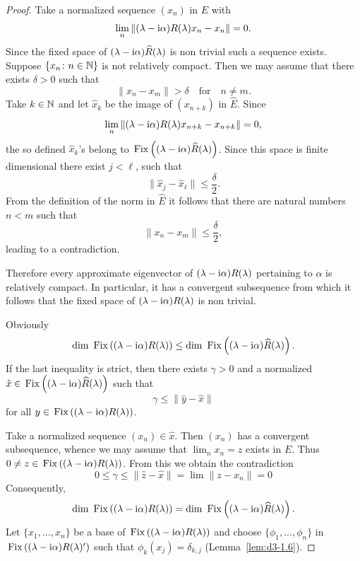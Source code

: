 \begin{proof}
Take a normalized sequence $(x_{n})$ in $E$ with
\[
\lim_{n}\|(\lambda - \mathrm{i}\alpha)R(\lambda)x_{n} - x_{n}\| = 0 .
\]
Since the fixed space of {$(\lambda-\mathrm{i}\alpha)\widehat{R}(\lambda)$} is non trivial such a sequence exists.
Suppose $\{ x_{n} \colon n\in\mathbb{N} \}$ is not relatively compact.
Then we may assume that there exists $\delta > 0$ such that
\[
	\|x_{n} - x_{m}\| > \delta \quad \text{for} \quad n \neq m .
\]
Take $k \in \mathbb{N} $ and let $\hat{x}_{k}$ be the image of\/ $(x_{n+k})$ in $\widehat{E}$.
Since
\[
	\lim_{n}\|(\lambda - \mathrm{i}\alpha)R(\lambda)x_{n+k} - x_{n+k}\| = 0 ,
\]
the so defined $\hat{x}_{k}$'s belong to $\mathop{}\mathrm{Fix}\left((\lambda - \mathrm{i}\alpha)\widehat{R}(\lambda)\right)$.
Since this space is finite dimensional there exist $j < \ell$,  such that
\[
	\|\hat{x}_{j} - \hat{x}_{\ell}\| \leq \frac{\delta}{2} .
\]
From the definition of the norm in $\widehat{E}$ it follows that there are natural numbers $n < m$ such that
\[
\|x_{n} - x_{m}\| \leq \frac{\delta}{2} ,
\]
leading to a contradiction.

Therefore every approximate eigenvector of\/ $(\lambda - \mathrm{i}\alpha)R(\lambda)$ pertaining to $\alpha$ is relatively compact.
In particular, it has a convergent subsequence from which it follows that the fixed space of\/ $(\lambda - \mathrm{i}\alpha)R(\lambda)$ is non trivial.

Obviously
\[
\dim \Fix{(\lambda - \im\alpha)R(\lambda)} \leq \dim \Fix{(\lambda - \im\alpha)\widehat{R}(\lambda)} .
\]
If the last inequality is strict, then there exists $\gamma > 0$ and a normalized 
$\hat{x} \in \mathop{}\mathrm{Fix}\left((\lambda - \mathrm{i}\alpha)\widehat{R}(\lambda)\right)$ such that
\[
\gamma \leq \|\hat{y} - \hat{x}\|
\]
for all $y \in \mathop{}\mathrm{Fix}\left((\lambda - \mathrm{i}\alpha)R(\lambda)\right)$.

Take a normalized sequence $(x_{n}) \in \hat{x}$.
Then $(x_{n})$ has a convergent subsequence, whence we may assume that $\lim_{n} x_{n} = z$ exists in $E$.
Thus $0 \neq z \in \mathop{}\mathrm{Fix}\left((\lambda - \mathrm{i}\alpha)R(\lambda)\right)$.
From this we obtain the contradiction
\[
 0 \leq \gamma \leq \|\hat{z} - \hat{x}\| = \lim \|z - x_{n}\| = 0
\]
Consequently,
\[
\mathop{}\!\mathrm{dim}\, \mathop{}\mathrm{Fix}\left((\lambda - \mathrm{i}\alpha)R(\lambda)\right) = \mathop{}\!\mathrm{dim}\, \mathop{}\mathrm{Fix}\left((\lambda - \mathrm{i}\alpha)\widehat{R}(\lambda)\right).
\]
Let $\{x_{1},...,x_{n}\}$ be a base of 
$\mathop{}\mathrm{Fix}\left((\lambda - \mathrm{i}\alpha)R(\lambda)\right)$ and choose $\{\phi_{1},...,\phi_{n}\}$ in 
$\mathop{}\mathrm{Fix}\left((\lambda - \mathrm{i}\alpha)R(\lambda)'\right)$ such that $\phi_{k}(x_{j}) = \delta_{k,j}$ 
(Lemma~\ref{lem:d3-1.6}).


\end{proof}
